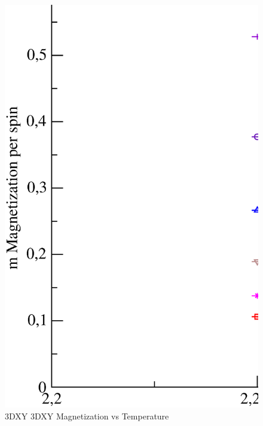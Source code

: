 \begin{figure}[!htpb]
  \centering
  \includegraphics[width=\textwidth]{./plots/3DXY/3DXY_Magnetization_vs_Temperature.eps}
  \caption{3DXY 3DXY Magnetization vs Temperature}
\end{figure}

